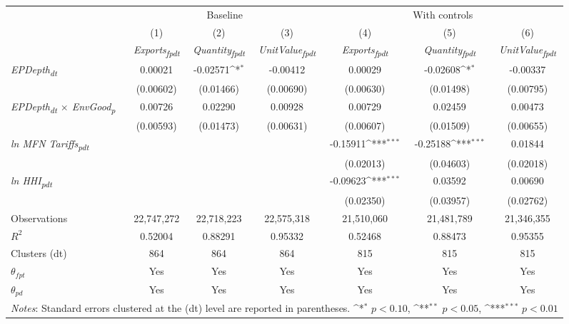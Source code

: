 {
\def\sym#1{\ifmmode^{#1}\else\(^{#1}\)\fi}
\begin{tabular}{l*{6}{c}}
\toprule
&\multicolumn{3}{c}{Baseline}&\multicolumn{3}{c}{With controls}\\\cmidrule(lr){2-4}\cmidrule(lr){5-7}
&(1)&(2)&(3)&(4)&(5)&(6)\\
&\textit{Exports\textsubscript{fpdt}}&\textit{Quantity\textsubscript{fpdt}}&\textit{UnitValue\textsubscript{fpdt}}&\textit{Exports\textsubscript{fpdt}}&\textit{Quantity\textsubscript{fpdt}}&\textit{UnitValue\textsubscript{fpdt}}\\
\midrule
\textit{EPDepth\textsubscript{dt}} & 0.00021 & -0.02571\sym{*} & -0.00412 & 0.00029 & -0.02608\sym{*} & -0.00337\\
 & (0.00602) & (0.01466) & (0.00690) & (0.00630) & (0.01498) & (0.00795)\\
\addlinespace
\textit{EPDepth\textsubscript{dt} $\times$ EnvGood\textsubscript{p}} & 0.00726 & 0.02290 & 0.00928 & 0.00729 & 0.02459 & 0.00473\\
 & (0.00593) & (0.01473) & (0.00631) & (0.00607) & (0.01509) & (0.00655)\\
\addlinespace
\textit{ln MFN Tariffs\textsubscript{pdt}} &  &  &  & -0.15911\sym{***} & -0.25188\sym{***} & 0.01844\\
 &  &  &  & (0.02013) & (0.04603) & (0.02018)\\
\addlinespace
\textit{ln HHI\textsubscript{pdt}} &  &  &  & -0.09623\sym{***} & 0.03592 & 0.00690\\
 &  &  &  & (0.02350) & (0.03957) & (0.02762)\\
\midrule
Observations & 22,747,272 & 22,718,223 & 22,575,318 & 21,510,060 & 21,481,789 & 21,346,355\\
$R^{2}$ & 0.52004 & 0.88291 & 0.95332 & 0.52468 & 0.88473 & 0.95355\\
Clusters (dt) & 864 & 864 & 864 & 815 & 815 & 815\\
$\theta_{fpt}$ & Yes & Yes & Yes & Yes & Yes & Yes\\
$\theta_{pd}$ & Yes & Yes & Yes & Yes & Yes & Yes\\
\bottomrule
\multicolumn{7}{l}{\footnotesize \textit{Notes}: Standard errors clustered at the (dt) level are reported in parentheses. \sym{*} \(p<0.10\), \sym{**} \(p<0.05\), \sym{***} \(p<0.01\)}\\
\end{tabular}
}
